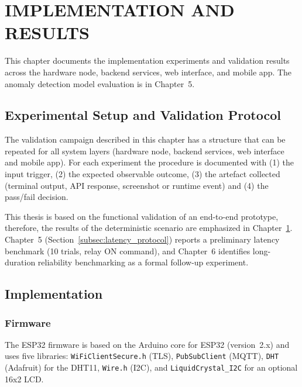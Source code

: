 \chapter{IMPLEMENTATION AND RESULTS}
\label{chap:experiments}

This chapter documents the implementation experiments and validation results across the hardware node, backend services, web interface, and mobile app. The anomaly detection model evaluation is in Chapter~5.

\section{Experimental Setup and Validation Protocol}
\label{sec:exp_setup}

The validation campaign described in this chapter has a structure that can be repeated for all system layers (hardware node, backend services, web interface and mobile app). For each experiment the procedure is documented with (1) the input trigger, (2) the expected observable outcome, (3) the artefact collected (terminal output, API response, screenshot or runtime event) and (4) the pass/fail decision.

This thesis is based on the functional validation of an end-to-end prototype, therefore, the results of the deterministic scenario are emphasized in Chapter~\ref{chap:experiments}. Chapter~5 (Section~\ref{subsec:latency_protocol}) reports a preliminary latency benchmark (10 trials, relay ON command), and Chapter~6 identifies long-duration reliability benchmarking as a formal follow-up experiment.


\section{Implementation}
\label{sec:implementation}

\subsection{Firmware}
\label{sec:hw_impl}

The ESP32 firmware is based on the Arduino core for ESP32 (version~2.x) and uses five libraries: \texttt{WiFiClientSecure.h} (TLS), \texttt{PubSubClient} (MQTT), \texttt{DHT} (Adafruit) for the DHT11, \texttt{Wire.h} (I2C), and \texttt{LiquidCrystal\_I2C} for an optional 16x2 LCD.

